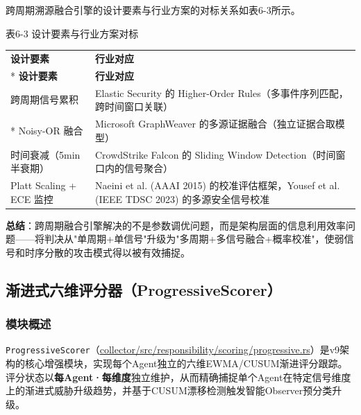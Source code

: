 \documentclass[a4paper]{ctexart}
\makeatletter
\renewcommand{\_}{%
  \ifmmode
    \nfss@text{\textunderscore}%
  \else
    \textunderscore\discretionary{}{}{}%
  \fi}
\makeatother
\begin{document}
跨周期溯源融合引擎的设计要素与行业方案的对标关系如表6-3所示。



\medskip
{\centering\small
表6-3 设计要素与行业方案对标\par
\vspace{3pt}
\setlength{\tabcolsep}{6pt}
\renewcommand{\arraystretch}{0.95}
\begin{longtable}{p{3.8cm} >{\raggedright\arraybackslash}p{11.4cm}}
\hline
\textbf{设计要素} & \textbf{行业对应} \\*
\hline
\endfirsthead
\hline
\textbf{设计要素} & \textbf{行业对应} \\
\hline
\endhead
\hline
\endfoot
\hline
\endlastfoot
跨周期信号累积 & Elastic Security 的 Higher-Order Rules（多事件序列匹配，跨时间窗口关联） \\*
\hline
Noisy-OR 融合 & Microsoft GraphWeaver 的多源证据融合（独立证据合取模型） \\
\hline
时间衰减（5min半衰期） & CrowdStrike Falcon 的 Sliding Window Detection（时间窗口内的信号聚合） \\
\hline
Platt Scaling + ECE 监控 & Naeini et al. (AAAI 2015) 的校准评估框架，Yousef et al. (IEEE TDSC 2023) 的多源安全信号校准 \\
\hline
\end{longtable}
\par}



\textbf{总结}：跨周期融合引擎解决的不是参数调优问题，而是架构层面的信息利用效率问题——将判决从"单周期+单信号"升级为"多周期+多信号融合+概率校准"，使弱信号和时序分散的攻击模式得以被有效捕捉。


\subsection{渐进式六维评分器（ProgressiveScorer）}



\subsubsection{模块概述}



\texttt{ProgressiveScorer}（\url{collector/src/responsibility/scoring/progressive.rs}）是v9架构的核心增强模块，实现每个Agent独立的六维EWMA/CUSUM渐进评分跟踪。评分状态以\textbf{每Agent·每维度}独立维护，从而精确捕捉单个Agent在特定信号维度上的渐进式威胁升级趋势，并基于CUSUM漂移检测触发智能Observer预分类升级。
\end{document}
